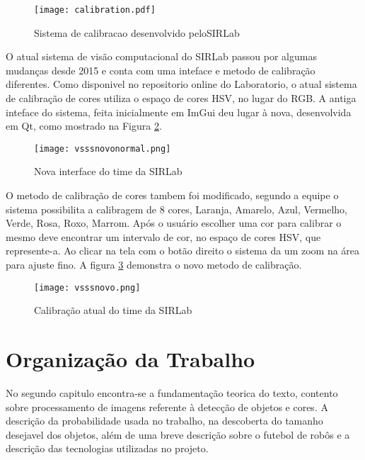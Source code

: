 \begin{figure}[!h]
	\centering
	\texttt{[image: calibration.pdf]} 	
	\caption{Sistema de calibracao desenvolvido peloSIRLab \cite{VSSVision}}
	\label{SIRLabCalibracaoHSV}
\end{figure}

O atual sistema de visão computacional do SIRLab passou por algumas mudanças desde 2015 e conta com uma inteface e metodo de calibração diferentes\cite{VSSVision}. 
Como disponivel no repositorio online do Laboratorio, o atual sistema de calibração de cores utiliza o espaço de cores HSV, no lugar do RGB\cite{Rosa:2015}. A antiga inteface do sistema, feita inicialmente em ImGui deu lugar à nova, desenvolvida em Qt, como mostrado na Figura \ref{SIRLabNova}.
\begin{figure}[!h]
	\centering
	\texttt{[image: vsssnovonormal.png]} 	
	\caption{Nova interface do time da SIRLab \cite{VSSVision}}
	\label{SIRLabNova}
\end{figure}

O metodo de calibração de cores tambem foi modificado, segundo a equipe\cite{VSSVision} o sistema possibilita a calibragem de 8 cores, Laranja, Amarelo, Azul, Vermelho, Verde, Rosa, Roxo, Marrom. Após o usuário escolher uma cor para calibrar o mesmo deve encontrar um intervalo de cor, no espaço de cores HSV, que represente-a. Ao clicar na tela com o botão direito o sistema da um zoom na área para ajuste fino. A figura \ref{SIRLabNovaCalibracao} demonstra o novo metodo de calibração.

\begin{figure}[!h]
	\centering
	\texttt{[image: vsssnovo.png]} 	
	\caption{Calibração atual do time da SIRLab \cite{VSSVision}}
	\label{SIRLabNovaCalibracao}
\end{figure}


\section{Organização da Trabalho} \label{Sec:Organizacao}
No segundo capitulo encontra-se a fundamentação teorica do texto, contento sobre processamento de imagens referente à detecção de objetos e cores. A descrição da probabilidade usada no trabalho, na descoberta do tamanho desejavel dos objetos, além de uma breve descrição sobre o futebol de robôs e a descrição das tecnologias utilizadas no projeto.